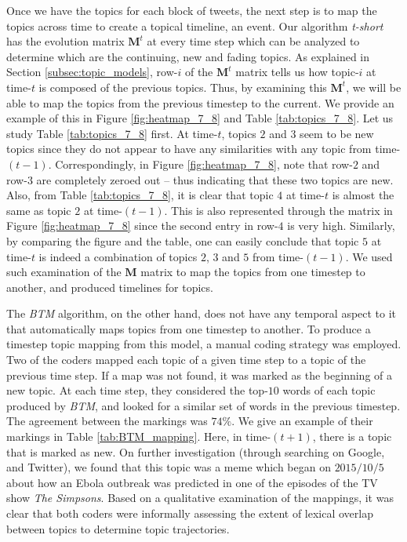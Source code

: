 Once we have the topics for each block of tweets, the next step is to map the
topics across time to create a topical timeline, an event.
Our algorithm \emph{t-short} has the evolution matrix
$\textbf{M}^t$ at every time step which can be analyzed to determine which
are the continuing, new and fading topics.  As
explained in Section \ref{subsec:topic_models}, row-$i$ of the $\textbf{M}^t$ matrix
tells us how topic-$i$ at time-$t$ is composed of the previous topics.  Thus, by examining
this $\textbf{M}^t$, we will be able to map the topics from the previous timestep
to the current.  We provide an example of this in Figure \ref{fig:heatmap_7_8} and
Table \ref{tab:topics_7_8}.  Let us study Table \ref{tab:topics_7_8} first.
At time-$t$, topics $2$ and $3$ seem to be new topics since they do not appear
to have any similarities with any topic from time-$(t-1)$.  Correspondingly,
in Figure \ref{fig:heatmap_7_8}, note that row-$2$ and row-$3$ are completely
zeroed out -- thus indicating that these two topics are new.  Also, from Table \ref{tab:topics_7_8},
it is clear that topic $4$ at time-$t$ is almost the same as topic $2$ at time-$(t-1)$.  This
is also represented through the matrix in Figure \ref{fig:heatmap_7_8} since the second entry
in row-$4$ is very high.  Similarly, by comparing the figure and the table, one can
easily conclude that topic $5$ at time-$t$ is indeed a combination of topics $2$, $3$ and $5$
from time-$(t-1)$.  We used such examination of the $\textbf{M}$ matrix to map the topics
from one timestep to another, and produced timelines for topics.

The \emph{BTM} algorithm, on the other hand, does not have any temporal aspect to it that automatically
maps topics from one timestep to another.  
To produce a timestep topic mapping from this model, 
a manual coding strategy was employed. 
Two of the coders mapped each topic of a
given time step to a topic of the previous 
time step. If a map was not found, it was marked 
as the beginning of a new
topic.
At each time step, they considered the top-$10$ words of each topic produced
by \emph{BTM}, and looked for a similar set of words in the previous timestep.
The agreement between the markings was $74\%$.  We give an example of their markings
in Table \ref{tab:BTM_mapping}.  Here, in time-$(t+1)$, there is a topic that is marked
as new.  On further investigation (through searching on Google, and Twitter), we found
that this topic was a meme which began on $2015/10/5$ about how an Ebola outbreak
was predicted in one of the episodes of the TV show \emph{The Simpsons}.  
Based on a qualitative examination of the mappings, it was clear that 
both coders were informally assessing the extent of 
lexical overlap between topics to determine topic trajectories.

